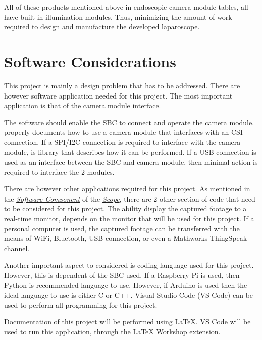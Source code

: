 \noindent All of these products mentioned above in endoscopic camera module tables, all have built in illumination modules. Thus, minimizing the amount of work required to design and manufacture the developed laparoscope.


\section{Software Considerations}
\label{sec:Software Considerations}

This project is mainly a design problem that has to be addressed. There are however software application needed for this project. The most important application is that of the camera module interface. 

\vspace{0.5cm}
\noindent The software should enable the SBC to connect and operate the camera module. \citet{RP-DOC} properly documents how to use a camera module that interfaces with an CSI connection. If a SPI/I2C connection is required to interface with the camera module, \citet{GH-AA} is library that describes how it can be performed. If  a USB connection is used as an interface between the SBC and camera module, then minimal action is required to interface the 2 modules. \citep{ML-USB} 

\vspace{0.5cm}
\noindent There are however other applications required for this project. As mentioned in the \textit{\hyperref[sec:Software Component]{Software Component}} of the \textit{\hyperref[sec:Scope]{Scope}}, there are 2 other section of code that need to be considered for this project. The ability display the captured footage to a real-time monitor, depends on the monitor that will be used for this project. If a personal computer is used, the captured footage can be transferred with the means of WiFi, Bluetooth, USB connection, or even a Mathworks ThingSpeak channel.\citep{MW-TS}

\vspace{0.5cm}
\noindent Another important aspect to considered is coding language used for this project. However, this is dependent of the SBC used. If a Raspberry Pi is used, then Python is recommended language to use. \citep{RP-DOC} However, if Arduino is used then the ideal language to use is either C or C++. \citep{A-DOC} Visual Studio Code (VS Code) can be used to perform all programming for this project.

\vspace{0.5cm}
\noindent Documentation of this project will be performed using LaTeX. VS Code will be used to run this application, through the LaTeX Workshop extension.\citep{VS-LW}

